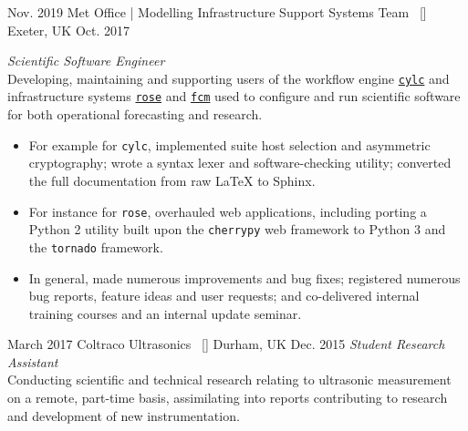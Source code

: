 \begin{experiences}
\emptySeparator
   \researchexperience
    {Nov. 2019}   {Met Office | Modelling Infrastructure Support Systems Team{\normalfont  ~ [\href{https://www.metoffice.gov.uk/research/weather/weather-science-it/modelling-support}{\small{\websiteSymbol}}]
    }}{Exeter, UK}{}
    {Oct. 2017} {\textit{Scientific Software Engineer}\\
Developing, maintaining and supporting users of the workflow engine \href{https://github.com/cylc}{\texttt{cylc}} and infrastructure systems \href{https://github.com/metomi/rose}{\texttt{rose}} and \href{https://github.com/metomi/fcm}{\texttt{fcm}} used to configure and run scientific software for both operational forecasting and research.
    \begin{itemize}
        \itemsep0em 
        \item For example for \texttt{cylc}, implemented suite host selection and asymmetric cryptography; wrote a syntax lexer and software-checking utility; converted the full documentation from raw \LaTeX \hspace{0.1em} to Sphinx.
        \item For instance for \texttt{rose}, overhauled web applications, including porting a Python 2 utility built upon the \texttt{cherrypy} web framework to Python 3 and the \texttt{tornado} framework.
        \item In general, made numerous improvements and bug fixes; registered numerous bug reports, feature ideas and user requests; and co-delivered internal training courses and an internal update seminar.
    \end{itemize}
    }
\emptySeparator
   \researchexperience
    {March 2017} {Coltraco Ultrasonics{\normalfont  ~ [\href{https://coltraco.com/}{\small{\websiteSymbol}}]
    }}{Durham, UK}{}
    {Dec. 2015} {\textit{Student Research Assistant}\\
    Conducting scientific and technical research relating to ultrasonic measurement on a remote, part-time basis, assimilating into reports contributing to research and development of new instrumentation.
    }
\end{experiences}
\vspace{-4mm}
